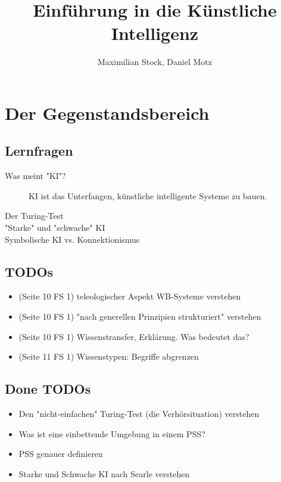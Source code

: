 \documentclass[runningheads]{llncs}
\begin{document}
%
\title{
    Einführung in die Künstliche Intelligenz
}
%
%
\author{Maximilian Stock, Daniel Motz}
%
%
%
\maketitle %
%

\section{Der Gegenstandsbereich}
\subsection{Lernfragen}
\begin{description}
  \item[Was meint "KI"?] KI ist das Unterfangen, künstliche intelligente Systeme zu bauen. 
  \item[Der Turing-Test]
  \item["Starke" und "schwache" KI]
  \item[Symbolische KI vs. Konnektionismus]
\end{description}

\subsection{TODOs}
\begin{itemize}
    \item (Seite 10 FS 1) teleologischer Aspekt WB-Systeme verstehen
    \item (Seite 10 FS 1) "nach generellen Prinzipien strukturiert" verstehen
    \item (Seite 10 FS 1) Wissenstransfer, Erklärung. Was bedeutet das?
    \item (Seite 11 FS 1) Wissenstypen: Begriffe abgrenzen
\end{itemize} 

\subsection*{Done TODOs}
\begin{itemize}
    \item Den "nicht-einfachen" Turing-Test (die Verhörsituation) verstehen
    \item Was ist eine einbettende Umgebung in einem PSS?
    \item PSS genauer definieren
    \item Starke und Schwache KI nach Searle verstehen
\end{itemize}
\end{document}
